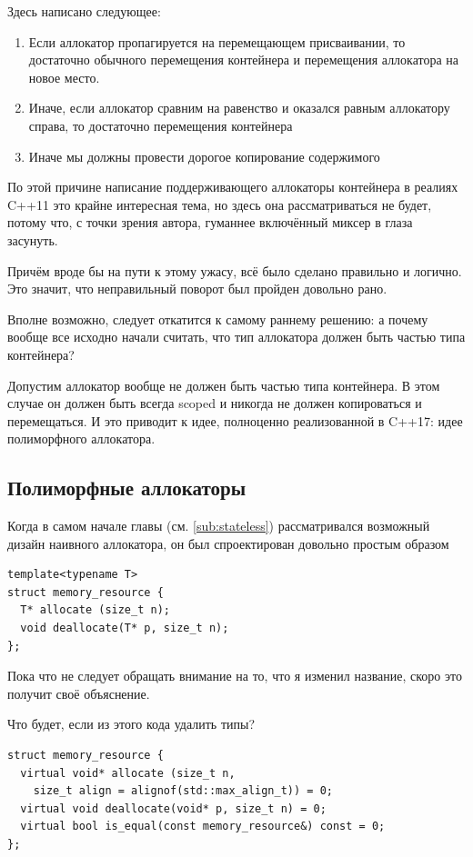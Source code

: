 \documentclass[a4paper,12pt,oneside]{book}
\begin{document}
Здесь написано следующее:

\begin{enumerate}
\item Если аллокатор пропагируется на перемещающем присваивании, то достаточно обычного перемещения контейнера и перемещения аллокатора на новое место.
\item Иначе, если аллокатор сравним на равенство и оказался равным аллокатору справа, то достаточно перемещения контейнера
\item Иначе мы должны провести дорогое копирование содержимого
\end{enumerate}

По этой причине написание поддерживающего аллокаторы контейнера в реалиях C++11 это крайне интересная тема, но здесь она рассматриваться не будет, потому что, с точки зрения автора, гуманнее включённый миксер в глаза засунуть.

Причём вроде бы на пути к этому ужасу, всё было сделано правильно и логично. Это значит, что неправильный поворот был пройден довольно рано.

Вполне возможно, следует откатится к самому раннему решению: а почему вообще все исходно начали считать, что тип аллокатора должен быть частью типа контейнера?

Допустим аллокатор вообще не должен быть частью типа контейнера. В этом случае он должен быть всегда scoped и никогда не должен копироваться и перемещаться. И это приводит к идее, полноценно реализованной в C++17: идее полиморфного аллокатора.

\subsection{Полиморфные аллокаторы}\label{sub:polyalloc}

Когда в самом начале главы (см. \ref{sub:stateless}) рассматривался возможный дизайн наивного аллокатора, он был спроектирован довольно простым образом

\begin{lstlisting}
template<typename T>
struct memory_resource {
  T* allocate (size_t n);
  void deallocate(T* p, size_t n);
};
\end{lstlisting}

Пока что не следует обращать внимание на то, что я изменил название, скоро это получит своё объяснение. 

Что будет, если из этого кода удалить типы?

\begin{lstlisting}
struct memory_resource {
  virtual void* allocate (size_t n, 
    size_t align = alignof(std::max_align_t)) = 0;
  virtual void deallocate(void* p, size_t n) = 0;
  virtual bool is_equal(const memory_resource&) const = 0;
};
\end{lstlisting}
\end{document}
